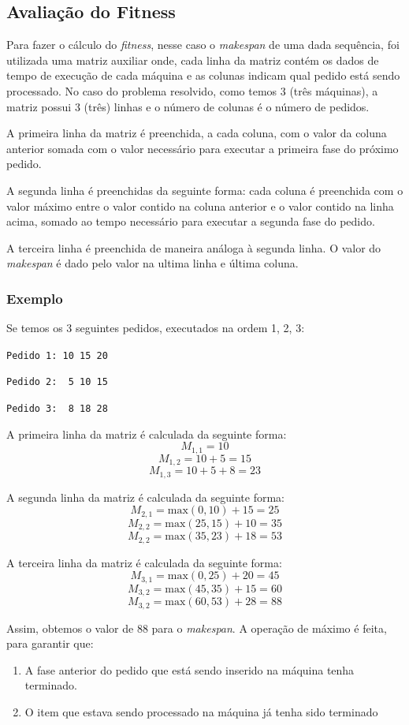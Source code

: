 \documentclass[12pt]{elsarticle}
\begin{document}
	\subsection{Avaliação do Fitness}
	Para fazer o cálculo do \emph{fitness}, nesse caso o \emph{makespan} de uma dada sequência, foi utilizada uma matriz auxiliar onde, cada linha da matriz contém os dados de tempo de execução de cada máquina e as colunas indicam qual pedido está sendo processado. No caso do problema resolvido, como temos 3 (três máquinas), a matriz possui 3 (três) linhas e o número de colunas é o número de pedidos.
	
	A primeira linha da matriz é preenchida, a cada coluna, com o valor da coluna anterior somada com o valor necessário para executar a primeira fase do próximo pedido.
	
	A segunda linha é preenchidas da seguinte forma: cada coluna é preenchida com o valor máximo entre o valor contido na coluna anterior e o valor contido na linha acima, somado ao tempo necessário para executar a segunda fase do pedido.
	
	A terceira linha é preenchida de maneira análoga à segunda linha. O valor do \emph{makespan} é dado pelo valor na ultima linha e última coluna.
	
	\subsubsection{Exemplo}
	Se temos os 3 seguintes pedidos, executados na ordem 1, 2, 3:
	
	\texttt{Pedido 1: 10 15 20}
	
	\texttt{Pedido 2: \ 5 10 15}
	
	\texttt{Pedido 3: \ 8 18 28}
	
	A primeira linha da matriz é calculada da seguinte forma:
	\[M_{1,1} = 10\]
	\[M_{1,2} = 10 + 5 = 15\]
	\[M_{1,3} = 10 + 5 + 8 = 23\]
	
	A segunda linha da matriz é calculada da seguinte forma:
	\[M_{2,1} = \mathrm{max}(0,10) + 15 = 25\]
	\[M_{2,2} = \mathrm{max}(25,15) + 10 = 35\]
	\[M_{2,2} = \mathrm{max}(35,23) + 18 = 53\]
	
	A terceira linha da matriz é calculada da seguinte forma:
	\[M_{3,1} = \mathrm{max}(0,25) + 20 = 45\]
	\[M_{3,2} = \mathrm{max}(45,35) + 15 = 60\]
	\[M_{3,2} = \mathrm{max}(60,53) + 28 = 88\]
	
	Assim, obtemos o valor de $88$ para o \emph{makespan}. A operação de máximo é feita, para garantir que:
	\begin{enumerate}
		\item A fase anterior do pedido que está sendo inserido na máquina tenha terminado.
		\item O item que estava sendo processado na máquina já tenha sido terminado
	\end{enumerate}
	
\end{document}
